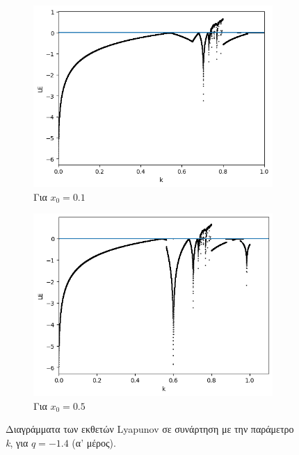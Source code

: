 \begin{figure}[ht]
	\centering
	
	\begin{subfigure}[b]{1\textwidth}
		\centering
		\includegraphics[width=\textwidth]{LateX images/graphs q14/g6}
		\caption{Για \(x_0=0.1\)}
		\label{f:g23}
	\end{subfigure}
	\hfill
	\begin{subfigure}[b]{1\textwidth}
		\centering
		\includegraphics[width=\textwidth]{LateX images/graphs q14/g7}
		\caption{Για \(x_0=0.5\)}
		\label{f:g24}
	\end{subfigure}
	\hfill
	\caption{ Διαγράμματα των εκθετών Lyapunov σε συνάρτηση με την παράμετρο \emph{k}, για  $q=-1.4$ (α' μέρος). }
\label{f:g233}
\end{figure}

